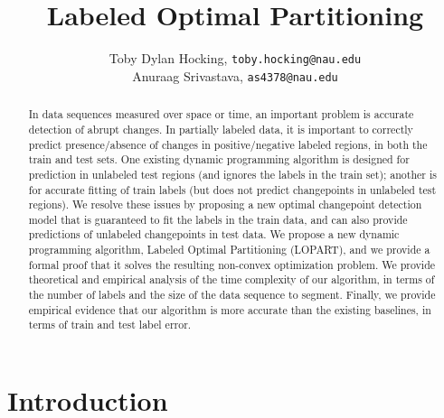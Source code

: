 \documentclass[12pt]{article}
\title{Labeled Optimal Partitioning}
\author{
  Toby Dylan Hocking, 
  \texttt{toby.hocking@nau.edu} \\
  Anuraag Srivastava,
  \texttt{as4378@nau.edu}
}
\begin{document}
\maketitle

\begin{abstract}
  In data sequences measured over space or time, an important problem is accurate detection of abrupt changes. 
  In partially labeled data, it is important to correctly predict presence/absence of changes in positive/negative labeled regions, in both the train and test sets.
  One existing dynamic programming algorithm is designed for prediction in unlabeled test regions (and ignores the labels in the train set); another is for accurate fitting of train labels (but does not predict changepoints in unlabeled test regions).
  We resolve these issues by proposing a new optimal changepoint detection model that is guaranteed to fit the labels in the train data, and can also provide predictions of unlabeled changepoints in test data.
  We propose a new dynamic programming algorithm, Labeled Optimal Partitioning (LOPART), and we provide a formal proof that it solves the resulting non-convex optimization problem.
  We provide theoretical and empirical analysis of the time complexity of our algorithm, in terms of the number of labels and the size of the data sequence to segment.
  Finally, we provide empirical evidence that our algorithm is more accurate than the existing baselines, in terms of train and test label error.
\end{abstract}

\section{Introduction}
\end{document}
